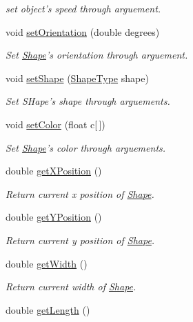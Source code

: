 \begin{DoxyCompactItemize}
\begin{DoxyCompactList}\small\item\em set object's speed through arguement. \end{DoxyCompactList}\item 
void \hyperlink{classShape_a51e0ae3cdae9992986711bf9e4de5821}{set\-Orientation} (double degrees)
\begin{DoxyCompactList}\small\item\em Set \hyperlink{classShape}{Shape}'s orientation through arguement. \end{DoxyCompactList}\item 
void \hyperlink{classShape_a610d97f732d655186a3cafa63b6f19fb}{set\-Shape} (\hyperlink{Shape_8h_a5a4538eeab397888d88a4eefcc5a1345}{Shape\-Type} shape)
\begin{DoxyCompactList}\small\item\em Set S\-Hape's shape through arguements. \end{DoxyCompactList}\item 
void \hyperlink{classShape_ae2f26cc38bb9b4018de216f63bf33f03}{set\-Color} (float c\mbox{[}$\,$\mbox{]})
\begin{DoxyCompactList}\small\item\em Set \hyperlink{classShape}{Shape}'s color through arguements. \end{DoxyCompactList}\item 
double \hyperlink{classShape_aa318a705f1462eec42c72a1581175cea}{get\-X\-Position} ()
\begin{DoxyCompactList}\small\item\em Return current x position of \hyperlink{classShape}{Shape}. \end{DoxyCompactList}\item 
double \hyperlink{classShape_a4abaab3fb5f7dd9ec5d370077c8a460d}{get\-Y\-Position} ()
\begin{DoxyCompactList}\small\item\em Return current y position of \hyperlink{classShape}{Shape}. \end{DoxyCompactList}\item 
double \hyperlink{classShape_a512f68cc25140a761d0daaca7e49dc42}{get\-Width} ()
\begin{DoxyCompactList}\small\item\em Return current width of \hyperlink{classShape}{Shape}. \end{DoxyCompactList}\item 
double \hyperlink{classShape_a89fea1a4257a592f4a94626df49af6be}{get\-Length} ()

\end{DoxyCompactItemize}
